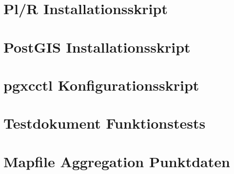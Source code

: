 \section{Pl/R Installationsskript}

\newpage
\section{PostGIS Installationsskript}

\newpage
\section{pgxcctl Konfigurationsskript}

\newpage
\section{Testdokument Funktionstests}

\newpage
\section{Mapfile Aggregation Punktdaten}

												

\pagestyle{empty}


